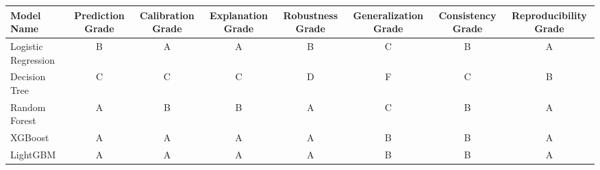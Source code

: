 \begin{tabular}{lccccccc}
\toprule
Model Name & Prediction Grade & Calibration Grade & Explanation Grade & Robustness Grade & Generalization Grade & Consistency Grade & Reproducibility Grade \\
\midrule
Logistic Regression & B & A & A & B & C & B & A \\
Decision Tree & C & C & C & D & F & C & B \\
Random Forest & A & B & B & A & C & B & A \\
XGBoost & A & A & A & A & B & B & A \\
LightGBM & A & A & A & A & B & B & A \\
\bottomrule
\end{tabular}
